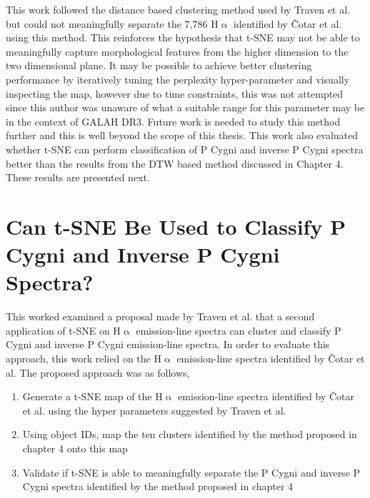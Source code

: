 This work followed the distance based clustering method used by Traven et al. but could not meaningfully separate the 7,786 H$\upalpha$ identified by Čotar et al. using this method. This reinforces the hypothesis that t-SNE may not be able to meaningfully capture morphological features from the higher dimension to the two dimensional plane. It may be possible to achieve better clustering performance by iteratively tuning the perplexity hyper-parameter and visually inspecting the map, however due to time constraints, this was not attempted since this author was unaware of what a suitable range for this parameter may be in the context of GALAH DR3. Future work is needed to study this method further and this is well beyond the scope of this thesis. This work also evaluated whether t-SNE can perform classification of P Cygni and inverse P Cygni spectra better than the results from the DTW based method discussed in Chapter 4. These results are presented next. 

\section{Can t-SNE Be Used to Classify P Cygni and Inverse P Cygni Spectra?}

This worked examined a proposal made by Traven et al. that a second application of t-SNE on H$\upalpha$ emission-line spectra can cluster and classify P Cygni and inverse P Cygni emission-line spectra. In order to evaluate this approach, this work relied on the H$\upalpha$ emission-line spectra identified by Čotar et al. The proposed approach was as follows,

\begin{enumerate}
    \item Generate a t-SNE map of the H$\upalpha$ emission-line spectra identified by Čotar et al. using the hyper parameters suggested by Traven et al.
    \item Using object IDs, map the ten clusters identified by the method proposed in chapter 4 onto this map
    \item Validate if t-SNE is able to meaningfully separate the P Cygni and inverse P Cygni spectra identified by the method proposed in chapter 4
\end{enumerate}

